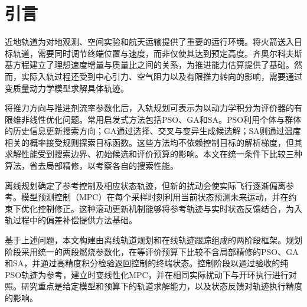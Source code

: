 \section{引言}
近地轨道为对地观测、空间实验和航天运输提供了重要的运行环境。将火箭送入目标轨道，需要同时调节终端位置与速度，而非仅使其达到预定高度。齐奥尔科夫斯基方程建立了理想速度增量与质量比之间的关系\cite{tsiolkovsky1903,sutton2016}，为推进能力估算提供了基础。然而，实际入轨过程还受到中心引力、空气阻力以及有限推力转向的影响，需要通过变质量动力学模型求解具体轨迹。

将推力方向与推进剂流率参数化后，入轨规划可表示为以动力学积分为评价器的有限维非线性优化问题。常用启发式方法包括PSO、GA和SA。PSO利用个体与群体的历史信息更新搜索方向\cite{kennedy1995pso}；GA通过选择、交叉与变异生成候选解\cite{holland1992}；SA则通过温度相关的概率接受规则探索目标函数\cite{kirkpatrick1983}。这些方法均不依赖控制目标的解析梯度，但其求解性能受到搜索边界、初始候选和评价预算的影响。本文在统一条件下比较三种算法，省去局部精修，以考察各自的搜索性能。

离线规划确定了参考控制及相应状态轨迹，但新的扰动会使实际飞行逐渐偏离参考。模型预测控制（MPC）在每个采样时刻利用当前状态预测未来运动，并在约束下优化控制修正\cite{mayne2000mpc,borrelli2017}。这种滚动更新机制能够将参考轨迹与实时状态反馈结合，为入轨过程中的偏差补偿提供方法基础。

基于上述问题，本文构建由离线轨道规划和在线轨迹跟踪组成的两阶段框架。规划阶段采用统一的两段燃烧参数化，在等评价预算下比较不含局部精修的PSO、GA和SA，并通过高精度积分检验返回控制的终端状态。控制阶段以通过验收的纯PSO轨迹为参考，建立时变线性化MPC，并在相同实际扰动下与开环执行进行对照。研究重点是给定模型和预算下的轨道求解能力，以及状态反馈对轨迹执行精度的影响。

